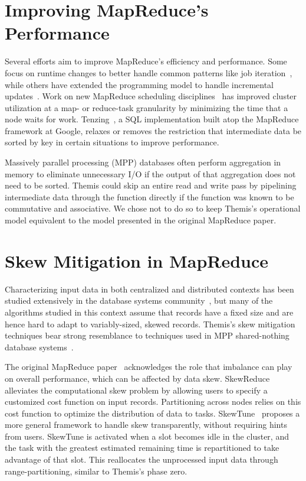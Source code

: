 \section{Improving MapReduce's Performance}

Several efforts aim to improve MapReduce's efficiency and performance.  Some
focus on runtime changes to better handle common patterns like job
iteration~\cite{haloop}, while others have extended the programming model to
handle incremental updates~\cite{CBP,percolator}.  Work on new MapReduce
scheduling disciplines~\cite{LATE} has improved cluster utilization at a map-
or reduce-task granularity by minimizing the time that a node waits for
work. Tenzing~\cite{tenzing}, a SQL implementation built atop the MapReduce
framework at Google, relaxes or removes the restriction that intermediate data
be sorted by key in certain situations to improve performance.

Massively parallel processing (MPP) databases often perform
aggregation in memory to eliminate unnecessary I/O if the output of that
aggregation does not need to be sorted.  Themis could skip an entire read and
write pass by pipelining intermediate data through the \reduce function
directly if the \reduce function was known to be commutative and
associative. We chose not to do so to keep Themis's operational model
equivalent to the model presented in the original MapReduce paper.

\section{Skew Mitigation in MapReduce}

Characterizing input data in both centralized and distributed contexts has been
studied extensively in the database systems
community~\cite{Manku99,DataSkeletons,Hadjieleftheriou2005}, but many of the
algorithms studied in this context assume that records have a fixed size and
are hence hard to adapt to variably-sized, skewed records. Themis's skew
mitigation techniques bear strong resemblance to techniques used in MPP
shared-nothing database systems~\cite{DeWittGraySkew}.

The original MapReduce paper~\cite{mapreduce} acknowledges the role that
imbalance can play on overall performance, which can be affected by data skew.
SkewReduce~\cite{SkewReduce} alleviates the computational skew problem by
allowing users to specify a customized cost function on input records.
Partitioning across nodes relies on this cost function to optimize the
distribution of data to tasks.  SkewTune~\cite{SkewTune} proposes a more
general framework to handle skew transparently, without requiring hints from
users.  SkewTune is activated when a slot becomes idle in the cluster, and
the task with the greatest estimated remaining time is repartitioned to take
advantage of that slot.  This reallocates the unprocessed input data through
range-partitioning, similar to Themis's phase zero.
